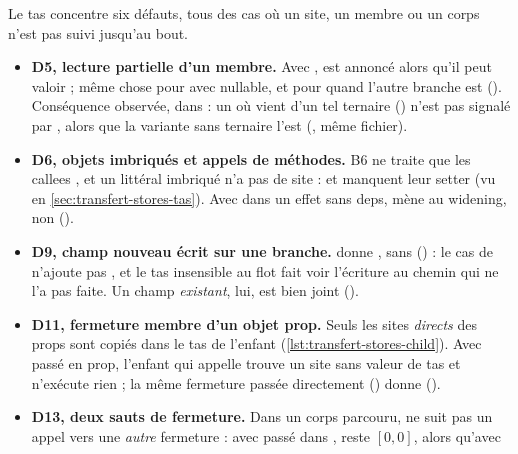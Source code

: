 Le tas concentre six défauts, tous des cas où un site, un membre ou un
corps n'est pas suivi jusqu'au bout.
\begin{itemize}
  \item \textbf{D5, lecture partielle d'un membre.} Avec
    ,  est annoncé
     alors qu'il peut valoir  ; même chose
    pour  avec  nullable, et pour  quand l'autre
    branche est  (). Conséquence
    observée, dans  : un
     où  vient d'un tel
    ternaire () n'est pas signalé par
    , alors que la variante sans ternaire l'est
    (, même fichier).
  \item \textbf{D6, objets imbriqués et appels de méthodes.} B6 ne traite
    que les callees , et un littéral imbriqué n'a pas de site :
     et  manquent leur setter (vu en
    \cref{sec:transfert-stores-tas}). Avec
     dans un effet sans deps,
     mène  au widening,  non
    ().
  \item \textbf{D9, champ nouveau écrit sur une branche.}
     donne ,
    sans  () : le cas
     de  n'ajoute pas ,
    et le tas insensible au flot fait voir l'écriture au chemin qui ne l'a
    pas faite. Un champ \emph{existant}, lui, est bien joint
    ().
  \item \textbf{D11, fermeture membre d'un objet prop.} Seuls les sites
    \emph{directs} des props sont copiés dans le tas de l'enfant
    (\cref{lst:transfert-stores-child}). Avec
     passé en prop, l'enfant qui
    appelle  trouve un site sans valeur de tas et n'exécute
    rien ; la même fermeture passée directement () donne
     ().
  \item \textbf{D13, deux sauts de fermeture.} Dans un corps parcouru,
     ne suit pas un appel vers une
    \emph{autre} fermeture : avec
     passé dans
    ,  reste $[0,0]$, alors qu'avec

\end{itemize}
